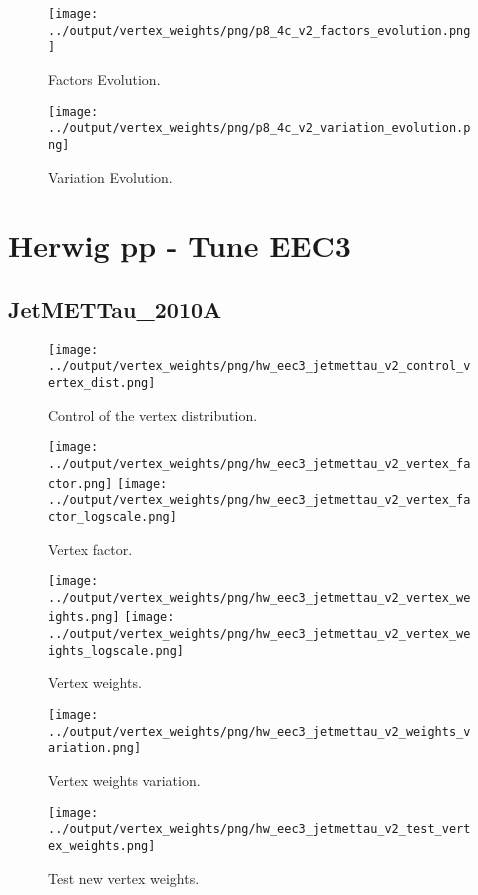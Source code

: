 \documentclass[11pt]{book}
\begin{document}
\begin{figure}[ht]
\centering
\texttt{[image: ../output/vertex\_weights/png/p8\_4c\_v2\_factors\_evolution.png]}
\caption{Factors Evolution.}
\end{figure}

\begin{figure}[ht]
\centering
\texttt{[image: ../output/vertex\_weights/png/p8\_4c\_v2\_variation\_evolution.png]}
\caption{Variation Evolution.}
\end{figure}
\clearpage


\section{Herwig pp - Tune EEC3}
\subsection{JetMETTau\_2010A}
\begin{figure}[ht]
\centering
\texttt{[image: ../output/vertex\_weights/png/hw\_eec3\_jetmettau\_v2\_control\_vertex\_dist.png]}
\caption{Control of the vertex distribution.}
\end{figure}

\begin{figure}[ht]
\centering
\texttt{[image: ../output/vertex\_weights/png/hw\_eec3\_jetmettau\_v2\_vertex\_factor.png]}
\texttt{[image: ../output/vertex\_weights/png/hw\_eec3\_jetmettau\_v2\_vertex\_factor\_logscale.png]}
\caption{Vertex factor.}
\end{figure}

\begin{figure}[ht]
\centering
\texttt{[image: ../output/vertex\_weights/png/hw\_eec3\_jetmettau\_v2\_vertex\_weights.png]}
\texttt{[image: ../output/vertex\_weights/png/hw\_eec3\_jetmettau\_v2\_vertex\_weights\_logscale.png]}
\caption{Vertex weights.}
\end{figure}

\begin{figure}[ht]
\centering
\texttt{[image: ../output/vertex\_weights/png/hw\_eec3\_jetmettau\_v2\_weights\_variation.png]}
\caption{Vertex weights variation.}
\end{figure}

\begin{figure}[ht]
\centering
\texttt{[image: ../output/vertex\_weights/png/hw\_eec3\_jetmettau\_v2\_test\_vertex\_weights.png]}
\caption{Test new vertex weights.}
\end{figure}
\clearpage
\end{document}

